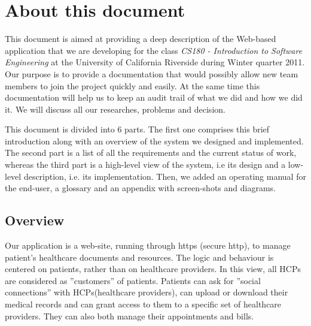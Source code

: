 \section{About this document}

This document is aimed at providing a deep description of the Web-based application that we are developing for the class \emph{CS180 - Introduction to Software Engineering} at the University of California Riverside during Winter quarter 2011. Our purpose is to provide a documentation that would possibly allow new team members to join the project quickly and easily. At the same time this documentation will help us to keep an audit trail of what we did and how we did it. We will discuss all our researches, problems and decision.

This document is divided into 6 parts. The first one comprises this brief introduction along with an overview of the system we designed and implemented. The second part is a list of all the requirements and the current status of work, whereas the third part is a high-level view of the system, i.e its design and a low-level description, i.e. its implementation. Then, we added an operating manual for the end-user, a glossary and an appendix with screen-shots and diagrams.

\subsection{Overview}
Our application is a web-site, running through https (secure http), to manage patient's healthcare documents and resources. The logic and behaviour is centered on patients, rather than on healthcare providers. In this view, all HCPs are considered as ''customers'' of patients. Patients can ask for ''social connections'' with HCPs(healthcare providers), can upload or download their medical records and can grant access to them to a specific set of healthcare providers. They can also both manage their appointments and bills.

